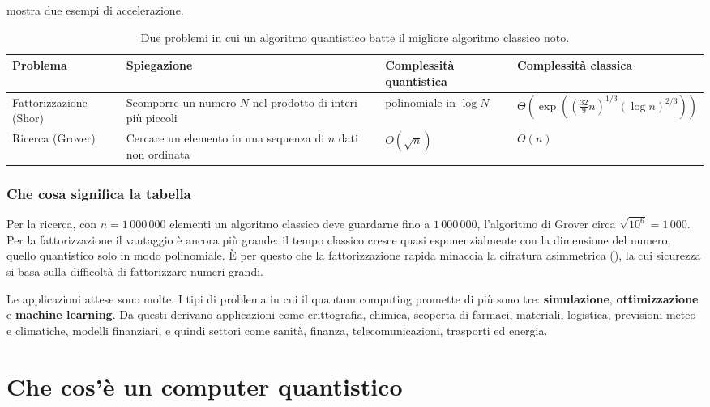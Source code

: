  mostra due esempi di accelerazione.

\begin{table}[ht]
\centering
\small
\caption{Due problemi in cui un algoritmo quantistico batte il migliore algoritmo classico noto.}
\label{tab:qse-speedup}
\begin{tabularx}{\linewidth}{>{\raggedright\arraybackslash}p{2.6cm}>{\raggedright\arraybackslash}X>{\raggedright\arraybackslash}p{2.6cm}>{\raggedright\arraybackslash}p{4.4cm}}
\toprule
Problema & Spiegazione & Complessità quantistica & Complessità classica \\
\midrule
Fattorizzazione (Shor) & Scomporre un numero $N$ nel prodotto di interi più piccoli & polinomiale in $\log N$ &
  $\Theta\!\left(\exp\!\left(\left(\tfrac{32}{9}n\right)^{1/3}(\log n)^{2/3}\right)\right)$ \\
Ricerca (Grover) & Cercare un elemento in una sequenza di $n$ dati non ordinata & $O(\sqrt{n})$ & $O(n)$ \\
\bottomrule
\end{tabularx}
\end{table}

\subsubsection{Che cosa significa la tabella\aggiunta}
Per la ricerca, con $n = 1\,000\,000$ elementi un algoritmo classico deve guardarne fino a $1\,000\,000$, l'algoritmo di
Grover circa $\sqrt{10^6} = 1\,000$. Per la fattorizzazione il vantaggio è ancora più grande: il tempo classico cresce
quasi esponenzialmente con la dimensione del numero, quello quantistico solo in modo polinomiale. È per questo che la
fattorizzazione rapida minaccia la cifratura asimmetrica (), la cui sicurezza si basa sulla
difficoltà di fattorizzare numeri grandi.

Le applicazioni attese sono molte. I tipi di problema in cui il quantum computing promette di più sono tre:
\textbf{simulazione}, \textbf{ottimizzazione} e \textbf{machine learning}. Da questi derivano applicazioni come
crittografia, chimica, scoperta di farmaci, materiali, logistica, previsioni meteo e climatiche, modelli finanziari,
e quindi settori come sanità, finanza, telecomunicazioni, trasporti ed energia.

\section{Che cos'è un computer quantistico}
\label{sec:qse-computer}

